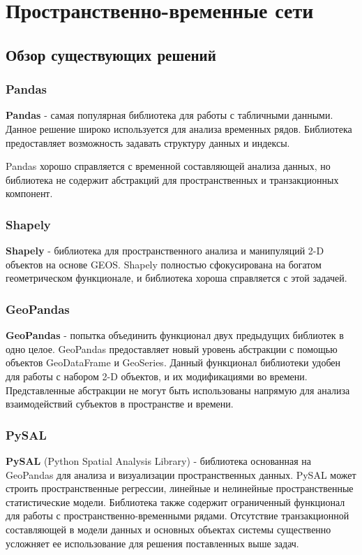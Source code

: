\chapter{Пространственно-временные сети}\label{ch:ch1}

\section{Обзор существующих решений}\label{sec:ch1/sec1}

\subsection*{Pandas}
\textbf{Pandas} - самая популярная библиотека для работы с табличными данными.  Данное решение широко используется для анализа временных рядов. Библиотека предоставляет возможность задавать структуру данных и индексы.

Pandas хорошо справляется с временной составляющей анализа данных, но библиотека не содержит абстракций для пространственных и транзакционных компонент.

\subsection*{Shapely}
\textbf{Shapely} - библиотека для пространственного анализа и манипуляций 2-D объектов на основе GEOS. Shapely полностью сфокусирована на богатом геометрическом функционале, и библиотека хороша справляется с этой задачей.

\subsection*{GeoPandas}
\textbf{{GeoPandas}} - попытка объединить функционал двух предыдущих библиотек в одно целое. GeoPandas предоставляет новый уровень абстракции с помощью объектов GeoDataFrame и GeoSeries. Данный функционал библиотеки удобен для работы с набором 2-D объектов, и их модификациями во времени. Представленные абстракции не могут быть использованы напрямую для анализа взаимодействий субъектов в пространстве и времени. 

\subsection*{PySAL}
\textbf{PySAL} (Python Spatial Analysis Library)  - библиотека основанная на GeoPandas для анализа и визуализации пространственных данных. PySAL может строить пространственные регрессии, линейные и нелинейные пространственные статистические модели. Библиотека также содержит ограниченный функционал для работы с пространственно-временными рядами.
Отсутствие транзакционной составляющей в модели данных и основных объектах системы существенно усложняет ее использование для решения поставленных выше задач. 
 
